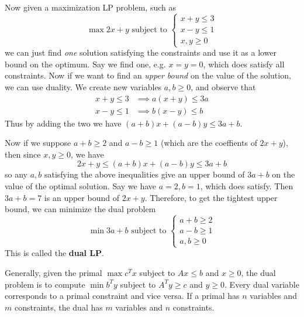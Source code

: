   \begin{example}
    Now given a maximization LP problem, such as 
    \begin{equation}
      \max{2x + y} \text{ subject to } \begin{cases} x + y \leq 3 \\ x - y \leq 1 \\ x, y \geq 0 \end{cases} 
    \end{equation}
    we can just find \textit{one} solution satisfying the constraints and use it as a lower bound on the optimum. Say we find one, e.g. $x = y = 0$, which does satisfy all constraints. Now if we want to find an \textit{upper bound} on the value of the solution, we can use duality. We create new variables $a, b \geq 0$, and observe that 
    \begin{align}
      x + y \leq 3 & \implies a (x + y) \leq 3a \\
      x - y \leq 1 & \implies b (x - y) \leq b
    \end{align}
    Thus by adding the two we have $(a + b) x + (a - b) y \leq 3a + b$. 

    Now if we suppose $a + b \geq 2$ and $a - b \geq 1$ (which are the coeffients of $2x + y$), then since $x, y \geq 0$, we have 
    \begin{equation}
      2x + y \leq (a + b) x + (a - b) y \leq 3a + b
    \end{equation} 
    so any $a, b$ satisfying the above inequalities give an upper bound of $3a + b$ on the value of the optimal solution. Say we have $a = 2, b = 1$, which does satisfy. Then $3a + b = 7$ is an upper bound of $2x + y$. Therefore, to get the tightest upper bound, we can minimize the dual problem 
    \begin{equation}
      \min{3a + b} \text{ subject to } \begin{cases} a + b \geq 2 \\ a - b \geq 1 \\ a, b \geq 0 \end{cases}
    \end{equation}
    This is called the \textbf{dual LP}.
  \end{example}
  
  Generally, given the primal $\max{c^T x}$ subject to $Ax \leq b$ and $x \geq 0$, the dual problem is to compute $\min{b^T y}$ subject to $A^T y \geq c$ and $y \geq 0$. Every dual variable corresponds to a primal constraint and vice versa. If a primal has $n$ variables and $m$ constraints, the dual has $m$ variables and $n$ constraints. 

